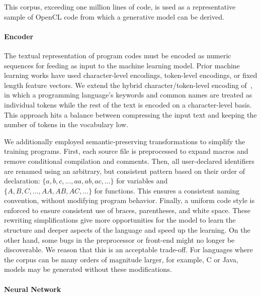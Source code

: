 This corpus, exceeding one million lines of code, is used as a representative
sample of OpenCL code from which a generative model can be derived.

\paragraph{Encoder}

The textual representation of program codes must be encoded as numeric sequences
for feeding as input to the machine learning model. Prior machine learning works
have used character-level encodings, token-level encodings, or fixed length
feature vectors. We extend the hybrid character/token-level encoding
of~\cite{Cummins2017b}, in which a programming language's keywords and common
names are treated as individual tokens while the rest of the text is encoded on
a character-level basis. This approach hits a balance between compressing the
input text and keeping the number of tokens in the vocabulary low.

We additionally employed semantic-preserving transformations to simplify the
training programs. First, each source file is preprocessed to expand macros and
remove conditional compilation and comments. Then, all user-declared identifiers
are renamed using an arbitrary, but consistent pattern based on their order of
declaration: $\{a,\allowbreak b,\allowbreak c,\allowbreak \ldots,\allowbreak
aa,\allowbreak ab,\allowbreak ac,\allowbreak \ldots\}$ for variables and
$\{A,\allowbreak B,\allowbreak C,\allowbreak \ldots,\allowbreak AA,\allowbreak
AB,\allowbreak AC,\allowbreak \ldots\}$ for functions. This ensures a consistent
naming convention, without modifying program behavior. Finally, a uniform code
style is enforced to ensure consistent use of braces, parentheses, and white
space. These rewriting simplifications give more opportunities for the model to
learn the structure and deeper aspects of the language and speed up the
learning. On the other hand, some bugs in the preprocessor or front-end might no
longer be discoverable. We reason that this is an acceptable trade-off. For
languages where the corpus can be many orders of magnitude larger, for example,
C or Java, models may be generated without these modifications.

\paragraph{Neural Network}

